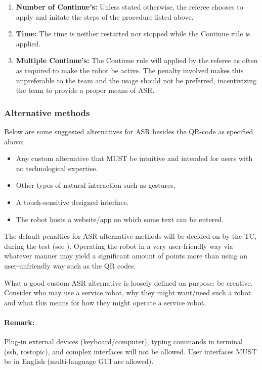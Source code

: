 \begin{enumerate}
	\item \textbf{Number of Continue's:} Unless stated otherwise, the referee chooses to apply and initate the steps of the procedure listed above.
	\item \textbf{Time:} The time is neither restarted nor stopped while the Continue rule is applied.
	\item \textbf{Multiple Continue's:} The Continue rule will applied by the referee as often as required to make the robot be active. The penalty involved makes this unpreferable to the team and the usage should not be preferred, incentivizing the team to provide a proper means of ASR.
\end{enumerate}


\subsubsection{Alternative methods}
Below are some suggested alternatives for ASR besides the QR-code as specified above:
\begin{itemize}
	\item Any custom alternative that MUST be intuitive and intended for users with no technological expertise.
 	\item Other types of natural interaction such as gestures.
 	\item A touch-sensitive designed interface.
	\item The robot hosts a website/app on which some text can be entered.
\end{itemize}

The default penalties for ASR alternative methods will be decided on by the TC, during the  test (see ).
Operating the robot in a very user-friendly way via whatever manner may yield a significant amount of points more than using an user-unfriendly way such as the QR codes. 

What a good custom ASR alternative is loosely defined on purpose: be creative. Consider who may use a service robot, why they might want/need such a robot and what this means for how they might operate a service robot.

\paragraph*{Remark:} Plug-in external devices (keyboard/computer), typing commands in terminal (ssh, rostopic), and complex interfaces will not be allowed. User interfaces MUST be in English (multi-language GUI are allowed).

